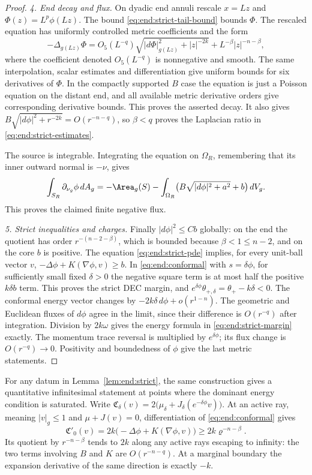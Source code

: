 \begin{proof}
\medskip\noindent\emph{4. End decay and flux.}
On dyadic end annuli rescale $x=Lz$ and
$\Phi(z)=L^p\phi(Lz)$.  The bound \eqref{eq:end:strict-tail-bound}
bounds $\Phi$.  The rescaled equation has uniformly controlled
metric coefficients and the form
\[
 -\Delta_{g(Lz)}\Phi
 =O_{5}(L^{-q})\sqrt{|d\Phi|_{g(Lz)}^2+|z|^{-2k}}
                       +L^{-\beta}|z|^{-n-\beta},
\]
where the coefficient denoted $O_5(L^{-q})$ is nonnegative
and smooth.  The same interpolation, scalar estimates and
differentiation give uniform bounds for six derivatives of
$\Phi$.  In the compactly supported $B$ case the equation is
just a Poisson equation on the distant end, and all available
metric derivative orders give corresponding derivative
bounds.  This proves the asserted decay.  It also gives
$B\sqrt{|d\phi|^2+r^{-2k}}=O(r^{-n-q})$, so $\beta<q$
proves the Laplacian ratio in
\eqref{eq:end:strict-estimates}.

The source is integrable.  Integrating the equation on
$\Omega_R$, remembering that its inner outward normal is
$-\nu$, gives
\[
 \int_{S_R}\partial_{\nu_g}\phi\,dA_g
 =-\Area_g(S)-\int_{\Omega_R}
              \bigl(B\sqrt{|d\phi|^2+a^2}+b\bigr)\,dV_g.
\]
This proves the claimed finite negative flux.

\medskip\noindent\emph{5. Strict inequalities and charges.}
Finally $|d\phi|^2\le Cb$ globally: on the end the quotient
has order $r^{-(n-2-\beta)}$, which is bounded because
$\beta<1\le n-2$, and on the core $b$ is positive.
The equation \eqref{eq:end:strict-pde} implies, for every unit-ball
vector $v$,
$-\Delta\phi+K(\nabla\phi,v)\ge b$.
In \eqref{eq:end:conformal} with $s=\delta\phi$,
for sufficiently small fixed $\delta>0$ the negative square
term is at most half the positive $k\delta b$ term.
This proves the strict DEC margin, and
$e^{\delta\phi}\theta_{+,\delta}=\theta_+-k\delta<0$.
The conformal energy vector changes by
$-2k\delta\,d\phi+o(r^{1-n})$.  The geometric and Euclidean
fluxes of $d\phi$ agree in the limit, since their difference
is $O(r^{-q})$ after integration.  Division by $2k\omega$
gives the energy formula in
\eqref{eq:end:strict-margin} exactly.  The momentum
trace reversal is multiplied by $e^{\delta\phi}$; its flux
change is $O(r^{-q})\to0$.  Positivity and boundedness of
$\phi$ give the last metric statements.
\end{proof}

For any datum in Lemma~\ref{lem:end:strict}, the same construction
gives a quantitative infinitesimal statement at points where the
dominant energy condition is saturated. Write
$\mathfrak C_\delta(v)=2\bigl(\mu_\delta+
J_\delta(e^{-\delta\phi}v)\bigr)$.  At an active ray,
meaning $|v|_g\le1$ and $\mu+J(v)=0$, differentiation of
\eqref{eq:end:conformal} gives
\begin{equation}\label{eq:end:strict-direction}
 \mathfrak C'_0(v)=2k\bigl(-\Delta\phi+K(\nabla\phi,v)\bigr)
       \ge2k\varrho^{-n-\beta}.
\end{equation}
Its quotient by $r^{-n-\beta}$ tends to $2k$ along any active
rays escaping to infinity: the two terms involving $B$ and $K$
are $O(r^{-n-q})$.  At a marginal boundary the expansion
derivative of the same direction is exactly $-k$.

